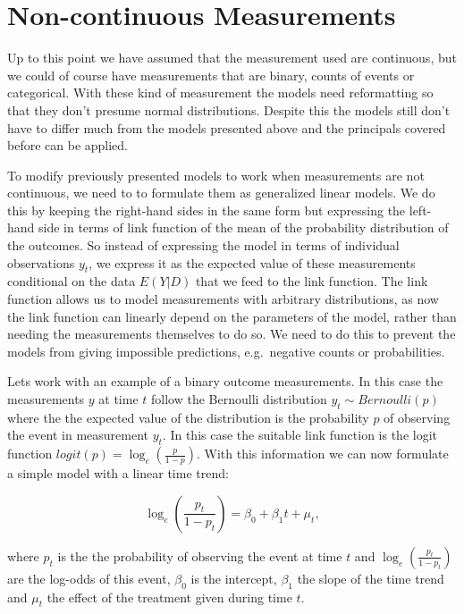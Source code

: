 \documentclass[12pt,a4paper,leqno]{report}
\theoremstyle{plain}
\theoremstyle{definition}
\theoremstyle{remark}
\begin{document}
\section{Non-continuous Measurements}\label{noncontinuous}

Up to this point we have assumed that the measurement used are continuous, but we could
of course have measurements that are binary, counts of events or categorical. With these
kind of measurement the models need reformatting so that they don't presume normal
distributions. Despite this the models still don't have to differ much from the models
presented above and the principals covered before can be applied.

To modify previously presented models to work when measurements are not continuous, we
need to to formulate them as generalized linear models. We do this by keeping the
right-hand sides in the same form but expressing the left-hand side in terms of link
function of the mean of the probability distribution of the outcomes. So instead of
expressing the model in terms of individual observations \(y_t\), we express it as the
expected value of these measurements conditional on the data \(E(Y|D)\) that we feed to
the link function. The link function allows us to model measurements with arbitrary
distributions, as now the link function can linearly depend on the parameters of the
model, rather than needing the measurements themselves to do so. We need to do this to
prevent the models from giving impossible predictions, e.g.\ negative counts or
probabilities.

Lets work with an example of a binary outcome measurements. In this case the measurements
\(y\) at time \(t\) follow the Bernoulli distribution \(y_t \sim Bernoulli(p)\) where the
the expected value of the distribution is the probability \(p\) of observing the event in
measurement \(y_t\). In this case the suitable link function is the logit function
\(logit(p)=\log_e(\frac{p}{1-p})\). With this information we can now formulate a simple
model with a linear time trend:

\begin{def}\label{}
    \begin{equation}
        \log_e(\frac{p_t}{1-p_t})=\beta_0 + \beta_1 t + \mu_t,
    \end{equation}
\end{def}where \(p_t\) is the the probability of observing the event at time \(t\) and
\(\log_e(\frac{p_t}{1-p_t})\) are the log-odds of this event, \(\beta_0\) is the
intercept, \(\beta_1\) the slope of the time trend and \(\mu_t\) the effect of the
treatment given during time \(t\).
\end{document}
